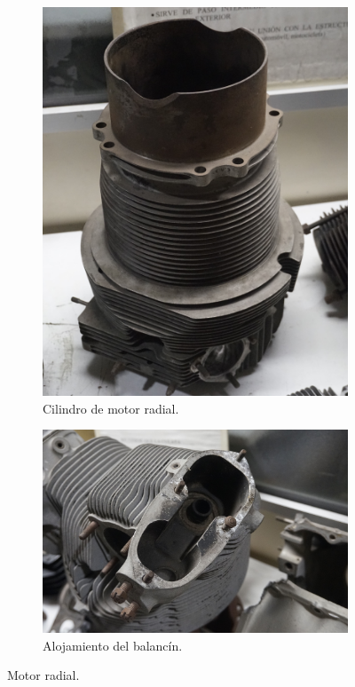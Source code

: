 \begin{figure}[H]
	\centering
	\begin{subfigure}[b]{0.45\textwidth}
		\centering
		\includegraphics[width=\linewidth]{Figures/02/m3/cilindro_radial.jpg}
		\caption{Cilindro de motor radial.}
		\label{fig:bloq_bmw}
	\end{subfigure}
	\hfill
	\begin{subfigure}[b]{0.45\textwidth}
 		\centering
 		\includegraphics[width=\linewidth]{Figures/02/m3/head_radial.jpg}
 		\caption{Alojamiento del balancín.}
		\label{fig:bloq_cig}
	\end{subfigure}    
	\caption{Motor radial.}
	\label{fig:block_radial}
\end{figure}


